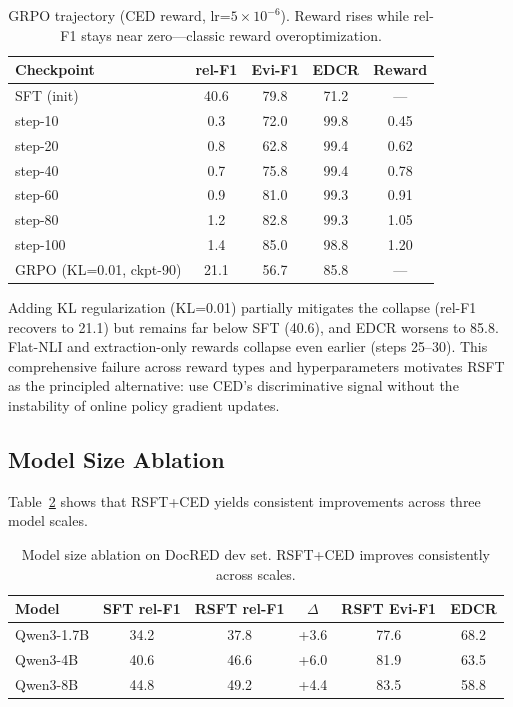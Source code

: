 \documentclass[11pt,a4paper]{article}
\begin{document}
\begin{table}[t]
\centering
\caption{GRPO trajectory (CED reward, lr=$5\times10^{-6}$). Reward rises while rel-F1 stays near zero---classic reward overoptimization.}
\label{tab:grpo}
\begin{tabular}{lcccc}
\toprule
\textbf{Checkpoint} & \textbf{rel-F1} & \textbf{Evi-F1} & \textbf{EDCR} & \textbf{Reward} \\
\midrule
SFT (init) & 40.6 & 79.8 & 71.2 & --- \\
step-10 & 0.3 & 72.0 & 99.8 & 0.45 \\
step-20 & 0.8 & 62.8 & 99.4 & 0.62 \\
step-40 & 0.7 & 75.8 & 99.4 & 0.78 \\
step-60 & 0.9 & 81.0 & 99.3 & 0.91 \\
step-80 & 1.2 & 82.8 & 99.3 & 1.05 \\
step-100 & 1.4 & 85.0 & 98.8 & 1.20 \\
\midrule
GRPO (KL=0.01, ckpt-90) & 21.1 & 56.7 & 85.8 & --- \\
\bottomrule
\end{tabular}
\end{table}

Adding KL regularization (KL=0.01) partially mitigates the collapse (rel-F1 recovers to 21.1) but remains far below SFT (40.6), and EDCR worsens to 85.8. Flat-NLI and extraction-only rewards collapse even earlier (steps 25--30). This comprehensive failure across reward types and hyperparameters motivates RSFT as the principled alternative: use CED's discriminative signal without the instability of online policy gradient updates.

\subsection{Model Size Ablation}

Table~\ref{tab:model_size} shows that RSFT+CED yields consistent improvements across three model scales.

\begin{table}[t]
\centering
\caption{Model size ablation on DocRED dev set. RSFT+CED improves consistently across scales.}
\label{tab:model_size}
\begin{tabular}{lccccc}
\toprule
\textbf{Model} & \textbf{SFT rel-F1} & \textbf{RSFT rel-F1} & $\Delta$ & \textbf{RSFT Evi-F1} & \textbf{EDCR} \\
\midrule
Qwen3-1.7B & 34.2 & 37.8 & +3.6 & 77.6 & 68.2 \\
Qwen3-4B & 40.6 & 46.6 & +6.0 & 81.9 & 63.5 \\
Qwen3-8B & 44.8 & 49.2 & +4.4 & 83.5 & 58.8 \\
\bottomrule
\end{tabular}
\end{table}
\end{document}
